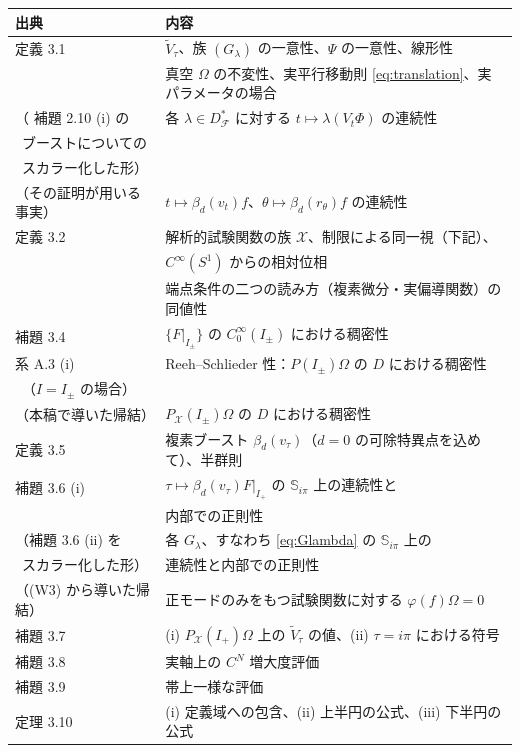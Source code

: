 \documentclass[11pt,a4paper]{article}
\newcommand{\Circ}{S^{1}}
\newcommand{\Fields}{\mathcal{F}}
\newcommand{\Xcl}{\mathcal{X}}
\newcommand{\Strip}{\mathbb{S}}
\newcommand{\Vt}{\widetilde{V}}
\newcommand{\Dom}{D}
\newcommand{\Dstar}{\Dom^{*}_{\Fields}}
\theoremstyle{definition}
\begin{document}
\begin{center}
\begin{tabular}{@{}ll@{}}
\hline
出典 & 内容 \\
\hline
\cite{T26} 定義 3.1 & $\Vt_\tau$、族 $(G_\lambda)$ の一意性、$\Psi$ の一意性、線形性 \\
 & 真空 $\Omega$ の不変性、実平行移動則 \eqref{eq:translation}、実パラメータの場合 \\
（\cite{CRTT25} 補題 2.10 (i) の & 各 $\lambda \in \Dstar$ に対する $t \mapsto \lambda(V_t\Phi)$ の連続性 \\
\ ブーストについての & \\
\ スカラー化した形） & \\
（その証明が用いる事実） & $t \mapsto \beta_d(v_t)f$、$\theta \mapsto \beta_d(r_\theta)f$ の連続性 \\
\cite{T26} 定義 3.2 & 解析的試験関数の族 $\Xcl$、制限による同一視（下記）、\\
 & $C^\infty(\Circ)$ からの相対位相 \\
 & 端点条件の二つの読み方（複素微分・実偏導関数）の同値性 \\
\cite{T26} 補題 3.4 & $\{F|_{I_\pm}\}$ の $C_0^\infty(I_\pm)$ における稠密性 \\
\cite{CRTT25} 系 A.3 (i) & Reeh--Schlieder 性：$P(I_\pm)\Omega$ の $\Dom$ における稠密性 \\
\ （$I = I_\pm$ の場合） & \\
（本稿で導いた帰結） & $P_\Xcl(I_\pm)\Omega$ の $\Dom$ における稠密性 \\
\cite{T26} 定義 3.5 & 複素ブースト $\beta_d(v_\tau)$（$d = 0$ の可除特異点を込めて）、半群則 \\
\cite{T26} 補題 3.6 (i) & $\tau \mapsto \beta_d(v_\tau)F|_{I_+}$ の $\Strip_{i\pi}$ 上の連続性と \\
 & 内部での正則性 \\
（補題 3.6 (ii) を & 各 $G_\lambda$、すなわち \eqref{eq:Glambda} の $\Strip_{i\pi}$ 上の \\
\ スカラー化した形） & 連続性と内部での正則性 \\
（(W3) から導いた帰結） & 正モードのみをもつ試験関数に対する $\varphi(f)\Omega = 0$ \\
\cite{T26} 補題 3.7 & (i) $P_\Xcl(I_+)\Omega$ 上の $\Vt_\tau$ の値、(ii) $\tau = i\pi$ における符号 \\
\cite{T26} 補題 3.8 & 実軸上の $C^N$ 増大度評価 \\
\cite{T26} 補題 3.9 & 帯上一様な評価 \\
\cite{T26} 定理 3.10 & (i) 定義域への包含、(ii) 上半円の公式、(iii) 下半円の公式 \\
\hline
\end{tabular}
\end{center}
\end{document}
